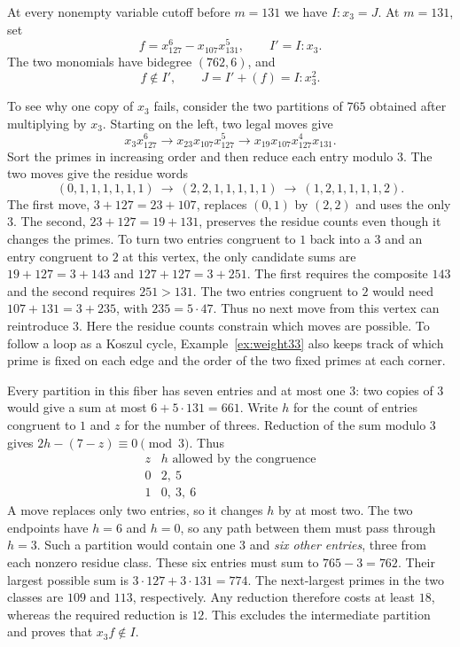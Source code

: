 \begin{example}\label{depth:cutoff132}
At every nonempty variable cutoff before $m=131$ we have $I:x_3=J$.
At $m=131$, set
\[
 f=x_{127}^6-x_{107}x_{131}^5,\qquad I'=I:x_3.
\]
The two monomials have bidegree $(762,6)$, and
\[
 f\notin I',\qquad J=I'+(f)=I:x_3^2.
\]

To see why one copy of $x_3$ fails, consider the two partitions of
$765$ obtained after multiplying by $x_3$. Starting on the left, two legal moves give
\[
 x_3x_{127}^6 \longrightarrow x_{23}x_{107}x_{127}^5
 \longrightarrow x_{19}x_{107}x_{127}^4x_{131}.
\]
Sort the primes in increasing order and then reduce each entry modulo $3$.
The two moves give the residue words
\[
 (0,1,1,1,1,1,1)\ \longrightarrow\
 (2,2,1,1,1,1,1)\ \longrightarrow\
 (1,2,1,1,1,1,2).
\]
The first move, $3+127=23+107$, replaces $(0,1)$ by $(2,2)$ and
uses the only $3$. The second, $23+127=19+131$, preserves the
residue counts even though it changes the primes. To turn two entries
congruent to $1$ back into a $3$ and an entry congruent to $2$ at
this vertex, the only candidate sums are $19+127=3+143$ and
$127+127=3+251$. The first requires the composite $143$ and the
second requires $251>131$. The two entries congruent to $2$ would need
$107+131=3+235$, with $235=5\cdot47$. Thus no next move from this
vertex can reintroduce $3$. Here the residue counts constrain which moves are possible. To follow a
loop as a Koszul cycle, Example~\ref{ex:weight33} also keeps track of
which prime is fixed on each edge and the order of the two fixed primes
at each corner.

Every partition in this fiber has seven entries and at most one $3$:
two copies of $3$ would give a sum at most $6+5\cdot131=661$.
Write $h$ for the count of entries congruent to $1$ and $z$ for the
number of threes. Reduction of the sum modulo $3$ gives
$2h-(7-z)\equiv0\pmod3$. Thus
\[
 \begin{array}{c|c}
 z & h\text{ allowed by the congruence}\\ \hline
 0 & 2,\ 5\\
 1 & 0,\ 3,\ 6
 \end{array}
\]
A move replaces only two entries, so it changes $h$ by at most two.
The two endpoints have $h=6$ and $h=0$, so any path between them must pass through $h=3$. Such a partition
would contain one $3$ and \emph{six other entries}, three from each
nonzero residue class. These six entries must sum to $765-3=762$.
Their largest possible sum is $3\cdot127+3\cdot131=774$. The
next-largest primes in the two classes are $109$ and $113$, respectively.
Any reduction therefore costs at least $18$, whereas the required
reduction is $12$. This excludes the intermediate partition and
proves that $x_3f\notin I$.


\end{example}
